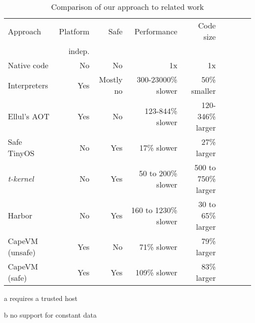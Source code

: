 
\begin{table}
\caption{Comparison of our approach to related work}
\label{tbl-contribution-comparison}
    \begin{threeparttable}
    \begin{tabular}{lrrrrrrrr}
    \toprule
    Approach        & Platform    & Safe               & Performance           & Code size                  \\
                    & indep.      &                    &                       &                            \\
    \midrule
    \midrule
    Native code     & No          & No                 & 1x                    & 1x                         \\
    Interpreters    & Yes         & Mostly no          & 300-23000\% slower    & ~50\% smaller \tnote{b}    \\
    Ellul's AOT     & Yes         & No                 & 123-844\% slower      & 120-346\% larger \tnote{b} \\
    Safe TinyOS     & No          & Yes \tnote{a}      & 17\% slower           & 27\% larger                \\
    \emph{t-kernel} & No          & Yes                & 50 to 200\% slower    & 500 to 750\% larger        \\
    Harbor          & No          & Yes                & 160 to 1230\% slower  & 30 to 65\% larger          \\
    CapeVM (unsafe) & Yes         & No                 & 71\% slower           & 79\% larger                \\ %
    CapeVM (safe)   & Yes         & Yes                & 109\% slower          & 83\% larger                \\ %
    \bottomrule
    \end{tabular}
    \begin{tablenotes}
        \item[a] requires a trusted host
        \item[b] no support for constant data
    \end{tablenotes}
    \end{threeparttable}
\end{table}
